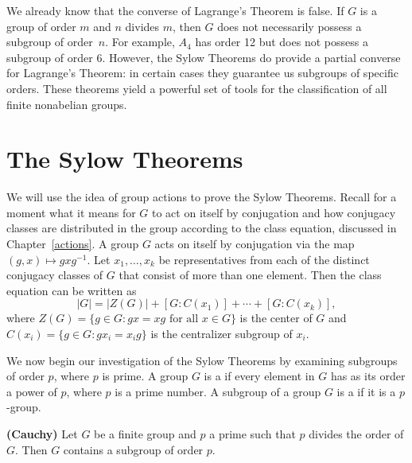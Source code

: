  
We already know that the converse of Lagrange's Theorem is false.  If $G$ is a group of order $m$ and $n$ divides $m$, then $G$ does not necessarily possess a subgroup of order~$n$.  For example, $A_4$ has order 12 but does not possess a subgroup of order 6.  However, the Sylow Theorems do provide a partial converse for Lagrange's Theorem: in certain cases they guarantee us subgroups of specific orders.  These theorems yield a powerful set of tools for the classification of all finite nonabelian groups.  

 
\section{The Sylow Theorems}

We will use the idea of  group actions to prove the Sylow Theorems.  Recall for a moment what it means for $G$ to act on itself by conjugation and how conjugacy classes are distributed in the group according to the class equation, discussed in Chapter~\ref{actions}.   A group  $G$ acts on itself by conjugation via the map $(g,x) \mapsto gxg^{-1}$. Let $x_1, \ldots, x_k$ be representatives from each  of the distinct conjugacy classes of $G$ that consist of more than one element. Then the class equation can be written as 
\[
|G| = |Z(G)| + [G: C(x_1) ] + \cdots + [ G: C(x_k)],
\]
where $Z(G) = \{g \in G : gx = xg \text{ for all } x \in G\}$ is the center of $G$ and  $C(x_i) = \{ g \in G : g x_i = x_i g \}$ is the centralizer subgroup of $x_i$.
 
We now begin our investigation of the Sylow Theorems by examining subgroups of order $p$, where $p$ is prime.  A group $G$ is a  if every element in $G$ has as
its order a power of $p$, where $p$ is a prime number. A subgroup of a group $G$ is a  if it is a  $p$-group.  
 
\begin{theorem} \textbf{(Cauchy)}
Let $G$ be a finite group and $p$ a prime such that $p$ divides the
order of $G$. Then $G$ contains a subgroup of order $p$.
\end{theorem}
 
